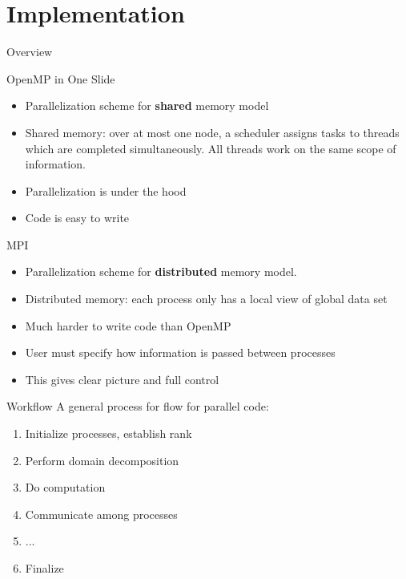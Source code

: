 \documentclass[pdf]{beamer}
\begin{document}
\section{Implementation}
 \begin{frame}{Overview}
  \tableofcontents[currentsection]
 \end{frame}

 \begin{frame}{OpenMP in One Slide}
  \begin{itemize}
	\item Parallelization scheme for \textbf{shared} memory model
	\item Shared memory: over at most one node, a scheduler assigns tasks to threads which are completed simultaneously. All threads work on the same scope of information. 
	\item Parallelization is under the hood
	\item Code is easy to write
  \end{itemize}
 \end{frame}

 \begin{frame}{MPI}
  \begin{itemize}
	\item Parallelization scheme for \textbf{distributed} memory model.
	\item Distributed memory: each process only has a local view of global data set 
	\item Much harder to write code than OpenMP
	\item User must specify how information is passed between processes 
	\item This gives clear picture and full control
  \end{itemize}
 \end{frame}

 \begin{frame}{Workflow}
  A general process for flow for parallel code:
  \begin{enumerate}
	\item Initialize processes, establish rank 
	\item Perform domain decomposition
	\item Do computation
	\item Communicate among processes 
	\item ...
	\item Finalize
  \end{enumerate}
 \end{frame}
\end{document}
